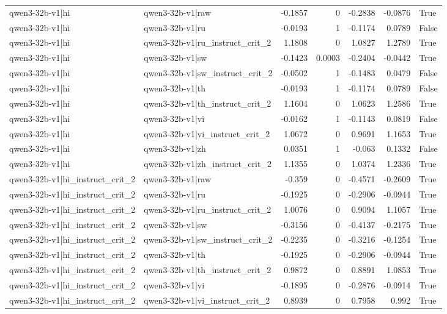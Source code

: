 \begin{table}
\begin{tabular}{l l r r r r l}
qwen3-32b-v1|hi & qwen3-32b-v1|raw & -0.1857 & 0 & -0.2838 & -0.0876 & True \\
qwen3-32b-v1|hi & qwen3-32b-v1|ru & -0.0193 & 1 & -0.1174 & 0.0789 & False \\
qwen3-32b-v1|hi & qwen3-32b-v1|ru_instruct_crit_2 & 1.1808 & 0 & 1.0827 & 1.2789 & True \\
qwen3-32b-v1|hi & qwen3-32b-v1|sw & -0.1423 & 0.0003 & -0.2404 & -0.0442 & True \\
qwen3-32b-v1|hi & qwen3-32b-v1|sw_instruct_crit_2 & -0.0502 & 1 & -0.1483 & 0.0479 & False \\
qwen3-32b-v1|hi & qwen3-32b-v1|th & -0.0193 & 1 & -0.1174 & 0.0789 & False \\
qwen3-32b-v1|hi & qwen3-32b-v1|th_instruct_crit_2 & 1.1604 & 0 & 1.0623 & 1.2586 & True \\
qwen3-32b-v1|hi & qwen3-32b-v1|vi & -0.0162 & 1 & -0.1143 & 0.0819 & False \\
qwen3-32b-v1|hi & qwen3-32b-v1|vi_instruct_crit_2 & 1.0672 & 0 & 0.9691 & 1.1653 & True \\
qwen3-32b-v1|hi & qwen3-32b-v1|zh & 0.0351 & 1 & -0.063 & 0.1332 & False \\
qwen3-32b-v1|hi & qwen3-32b-v1|zh_instruct_crit_2 & 1.1355 & 0 & 1.0374 & 1.2336 & True \\
qwen3-32b-v1|hi_instruct_crit_2 & qwen3-32b-v1|raw & -0.359 & 0 & -0.4571 & -0.2609 & True \\
qwen3-32b-v1|hi_instruct_crit_2 & qwen3-32b-v1|ru & -0.1925 & 0 & -0.2906 & -0.0944 & True \\
qwen3-32b-v1|hi_instruct_crit_2 & qwen3-32b-v1|ru_instruct_crit_2 & 1.0076 & 0 & 0.9094 & 1.1057 & True \\
qwen3-32b-v1|hi_instruct_crit_2 & qwen3-32b-v1|sw & -0.3156 & 0 & -0.4137 & -0.2175 & True \\
qwen3-32b-v1|hi_instruct_crit_2 & qwen3-32b-v1|sw_instruct_crit_2 & -0.2235 & 0 & -0.3216 & -0.1254 & True \\
qwen3-32b-v1|hi_instruct_crit_2 & qwen3-32b-v1|th & -0.1925 & 0 & -0.2906 & -0.0944 & True \\
qwen3-32b-v1|hi_instruct_crit_2 & qwen3-32b-v1|th_instruct_crit_2 & 0.9872 & 0 & 0.8891 & 1.0853 & True \\
qwen3-32b-v1|hi_instruct_crit_2 & qwen3-32b-v1|vi & -0.1895 & 0 & -0.2876 & -0.0914 & True \\
qwen3-32b-v1|hi_instruct_crit_2 & qwen3-32b-v1|vi_instruct_crit_2 & 0.8939 & 0 & 0.7958 & 0.992 & True \\

\end{tabular}
\end{table}
